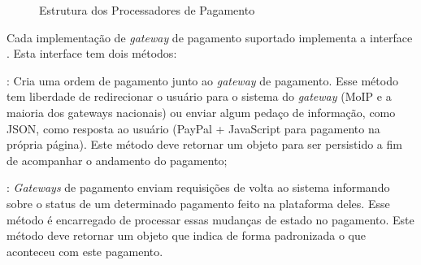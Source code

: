 \begin{figure}[H]
	\caption{\label{fig:uml_strategy}Estrutura dos Processadores de Pagamento}
    \centering
\end{figure}

Cada implementação de \emph{gateway} de pagamento suportado implementa a interface . Esta interface tem dois métodos:

\begin{lista}
  \item \textbf{}: Cria uma ordem de pagamento junto ao \emph{gateway} de pagamento. Esse método tem liberdade de redirecionar o usuário para o sistema do \emph{gateway} (MoIP e a maioria dos gateways nacionais) ou enviar algum pedaço de informação, como JSON, como resposta ao usuário (PayPal + JavaScript para pagamento na própria página). Este método deve retornar um objeto  para ser persistido a fim de acompanhar o andamento do pagamento;

  \item \textbf{}: \emph{Gateways} de pagamento enviam requisições de volta ao sistema informando sobre o status de um determinado pagamento feito na plataforma deles. Esse método é encarregado de processar essas mudanças de estado no pagamento. Este método deve retornar um objeto  que indica de forma padronizada o que aconteceu com este pagamento.
\end{lista}

